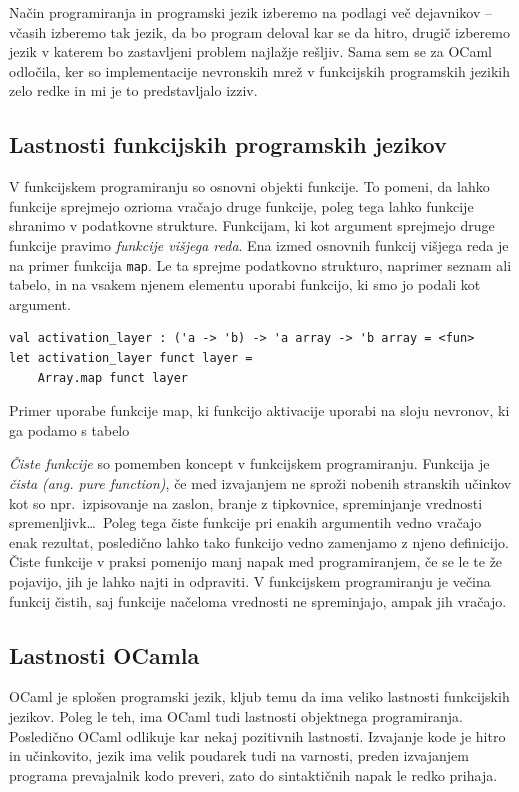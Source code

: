 \documentclass[mat1]{fmfdelo}
\begin{document}
Način programiranja in programski jezik izberemo na podlagi več dejavnikov -- včasih izberemo tak jezik, da bo program deloval kar se da hitro, drugič izberemo jezik v katerem bo zastavljeni problem najlažje rešljiv.
Sama sem se za OCaml odločila, ker so implementacije nevronskih mrež v funkcijskih programskih jezikih zelo redke in mi je to predstavljalo izziv. 
%
\subsection{Lastnosti funkcijskih programskih jezikov}
V funkcijskem programiranju so osnovni objekti funkcije. To pomeni, da lahko funkcije sprejmejo ozrioma vračajo druge funkcije, poleg tega lahko funkcije shranimo v podatkovne strukture. Funkcijam, ki kot argument sprejmejo druge funkcije pravimo \emph{funkcije višjega reda}. Ena izmed osnovnih funkcij višjega reda je na primer funkcija \texttt{map}. Le ta sprejme podatkovno strukturo, naprimer seznam ali tabelo, in na vsakem njenem elementu uporabi funkcijo, ki smo jo podali kot argument.
%
\begin{listing}[!h]
\begin{verbatim}
val activation_layer : ('a -> 'b) -> 'a array -> 'b array = <fun>
let activation_layer funct layer =
	Array.map funct layer
\end{verbatim} 
\caption{Primer uporabe funkcije map, ki funkcijo aktivacije uporabi na sloju nevronov, ki ga podamo s tabelo}
\label{algoritem}
\end{listing}

\emph{Čiste funkcije} so pomemben koncept v funkcijskem programiranju. Funkcija je \emph{čista} \emph{(ang. pure function)}, če med izvajanjem ne sproži nobenih stranskih učinkov kot so npr.\ izpisovanje na zaslon, branje z tipkovnice, spreminjanje vrednosti spremenljivk\ldots\ Poleg tega čiste funkcije pri enakih argumentih vedno vračajo enak rezultat, posledično lahko tako funkcijo vedno zamenjamo z njeno definicijo.  Čiste funkcije v praksi pomenijo manj napak med programiranjem, če se le te že pojavijo, jih je lahko najti in odpraviti. V funkcijskem programiranju je večina funkcij čistih, saj funkcije načeloma vrednosti ne spreminjajo, ampak jih vračajo. 
\subsection{Lastnosti OCamla}
OCaml je splošen programski jezik, kljub temu da ima veliko lastnosti funkcijskih jezikov. Poleg le teh, ima OCaml tudi lastnosti objektnega programiranja. 
Posledično OCaml odlikuje kar nekaj pozitivnih lastnosti. Izvajanje kode je hitro in učinkovito, jezik ima velik poudarek tudi na varnosti, preden izvajanjem programa prevajalnik kodo preveri, zato do sintaktičnih napak le redko prihaja.
\end{document}
